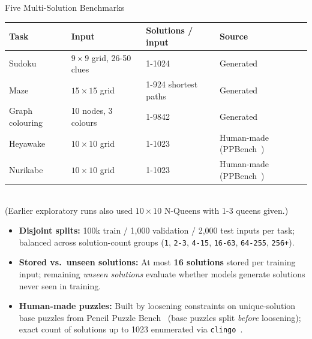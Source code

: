 \documentclass[aspectratio=169,10pt]{beamer}
\begin{document}

\begin{frame}{Five Multi-Solution Benchmarks}
  \centering
  \small
  \begin{tabular}{@{}llll@{}}
    \toprule
    \textbf{Task} & \textbf{Input} & \textbf{Solutions / input} & \textbf{Source} \\
    \midrule
    Sudoku & $9\times 9$ grid, 26-50 clues & 1-1024 & Generated \\
    Maze & $15\times 15$ grid & 1-924 shortest paths & Generated \\
    Graph colouring & 10 nodes, 3 colours & 1-9842 & Generated \\
    Heyawake & $10\times 10$ grid & 1-1023 & Human-made (PPBench~\cite{waugh2026}) \\
    Nurikabe & $10\times 10$ grid & 1-1023 & Human-made (PPBench~\cite{waugh2026}) \\
    \bottomrule
  \end{tabular}
  \\[0.25em]
  {\scriptsize (Earlier exploratory runs also used $10\times 10$ N-Queens with 1-3 queens given.)}

  \vspace{0.7em}
  \normalsize
  \begin{itemize}\setlength{\itemsep}{0.45em}
    \item \textbf{Disjoint splits:} 100k train / 1,000 validation / 2,000 test inputs per task; balanced across solution-count groups (\texttt{1}, \texttt{2-3}, \texttt{4-15}, \texttt{16-63}, \texttt{64-255}, \texttt{256+}).
    \item \textbf{Stored vs.\ unseen solutions:} At most \textbf{16 solutions} stored per training input; remaining \emph{unseen solutions} evaluate whether models generate solutions never seen in training.
    \item \textbf{Human-made puzzles:} Built by loosening constraints on unique-solution base puzzles from Pencil Puzzle Bench~\cite{waugh2026} (base puzzles split \emph{before} loosening); exact count of solutions up to 1023 enumerated via \texttt{clingo}~\cite{gebser2019}.
  \end{itemize}
\end{frame}


\end{document}
